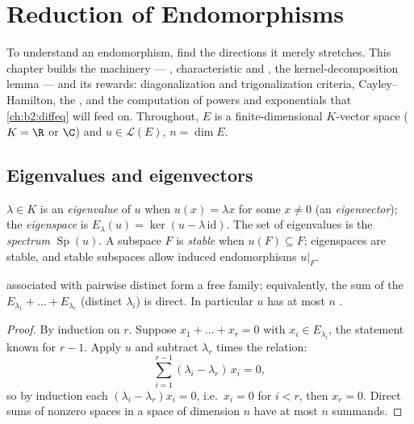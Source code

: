 \chapter{Reduction of Endomorphisms}\label{ch:b2:reduction}

To understand an endomorphism, find the directions it merely
stretches. This chapter builds the machinery --- ,
characteristic and , the kernel-decomposition
lemma --- and its rewards: diagonalization and trigonalization
criteria, Cayley--Hamilton, the , and the
computation of powers and exponentials that
\cref{ch:b2:diffeq} will feed on. Throughout, $E$ is a
finite-dimensional $K$-vector space ($K = \R$ or $\C$) and $u \in
\mathcal{L}(E)$, $n = \dim E$.

\section{Eigenvalues and eigenvectors}

\begin{definition}\label{def:b2:reduction:eigen}
$\lambda \in K$ is an \emph{eigenvalue} of $u$
when $u(x) = \lambda x$ for some $x \neq 0$ (an
\emph{eigenvector}); the \emph{eigenspace} is $E_\lambda(u) =
\ker(u - \lambda\,\mathrm{id})$. The set of eigenvalues is the
\emph{spectrum} $\operatorname{Sp}(u)$. A subspace $F$ is
\emph{stable} when $u(F) \subseteq F$; eigenspaces are stable, and
stable subspaces allow induced endomorphisms $u|_F$.
\end{definition}

\begin{theorem}\label{thm:b2:reduction:independence}
 associated with pairwise distinct  form a
free family; equivalently, the sum of the 
$E_{\lambda_1} + \dots + E_{\lambda_r}$ (distinct $\lambda_i$) is
direct. In particular $u$ has at most $n$ .
\end{theorem}

\begin{proof}
By induction on $r$. Suppose $x_1 + \dots + x_r = 0$ with $x_i \in
E_{\lambda_i}$, the statement known for $r - 1$. Apply $u$ and
subtract $\lambda_r$ times the relation:
\[
\sum_{i=1}^{r-1} (\lambda_i - \lambda_r)\, x_i = 0 ,
\]
so by induction each $(\lambda_i - \lambda_r)x_i = 0$, i.e.\ $x_i =
0$ for $i < r$, then $x_r = 0$. Direct sums of nonzero spaces in a
space of dimension $n$ have at most $n$ summands.
\end{proof}

